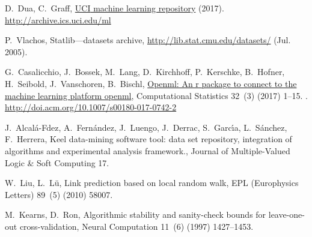 \documentclass[review,3p,twocolumn,times]{elsarticle}
\begin{document}
\begin{thebibliography}{10}
	D.~Dua, C.~Graff, \href{http://archive.ics.uci.edu/ml}{{UCI} machine learning
		repository} (2017).
	\newline\urlprefix\url{http://archive.ics.uci.edu/ml}
	
	P.~Vlachos, Statlib---datasets archive, \url{http://lib.stat.cmu.edu/datasets/}
	(Jul. 2005).
	
	G.~Casalicchio, J.~Bossek, M.~Lang, D.~Kirchhoff, P.~Kerschke, B.~Hofner,
	H.~Seibold, J.~Vanschoren, B.~Bischl,
	\href{http://doi.acm.org/10.1007/s00180-017-0742-2}{Openml: An r package to
		connect to the machine learning platform openml}, Computational Statistics
	32~(3) (2017) 1--15.
	\newblock \href {http://dx.doi.org/10.1007/s00180-017-0742-2}
	{}.
	\newline\urlprefix\url{http://doi.acm.org/10.1007/s00180-017-0742-2}
	
	J.~Alcal{\'a}-Fdez, A.~Fern{\'a}ndez, J.~Luengo, J.~Derrac, S.~Garc{\'\i}a,
	L.~S{\'a}nchez, F.~Herrera, Keel data-mining software tool: data set
	repository, integration of algorithms and experimental analysis framework.,
	Journal of Multiple-Valued Logic \& Soft Computing 17.
	
	W.~Liu, L.~L{\"u}, Link prediction based on local random walk, EPL (Europhysics
	Letters) 89~(5) (2010) 58007.
	
	M.~Kearns, D.~Ron, Algorithmic stability and sanity-check bounds for
	leave-one-out cross-validation, Neural Computation 11~(6) (1997) 1427--1453.
	
\end{thebibliography}
\end{document}
